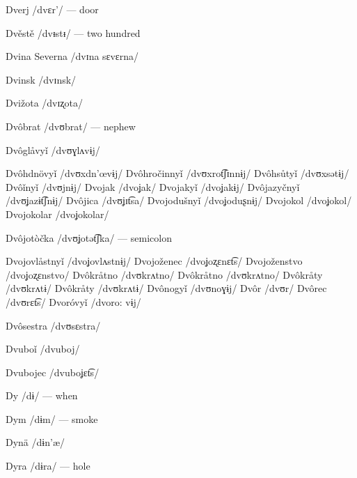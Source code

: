 Dverj /dvɛr’/ — door

Dvěstě /dvᵻstᵻ/ — two hundred

Dvina Severna /dvɪna sɛvɛrna/

Dvinsk /dvɪnsk/

Dvižota /dvɪʐota/

Dvôbrat /dvʊbrat/ — nephew

Dvôglåvyǐ /dvʊɣlʌvɨj/

Dvôhdnövyǐ /dvʊxdn’œvɨj/
Dvôhročinnyǐ /dvʊxrot͡ʃɪnnɨj/
Dvôhsůtyǐ /dvʊxsətɨj/
Dvôǐnyǐ /dvʊjnɨj/
Dvojak /dvoʝak/
Dvojakyǐ /dvoʝakɨj/
Dvôjazyčnyǐ /dvʊʝazɨt͡ʃnɨj/
Dvôjica /dvʊʝɪt͡sa/
Dvojodušnyǐ /dvoʝoduʂnɨj/
Dvojokol /dvoʝokol/
Dvojokolar /dvoʝokolar/

Dvôjotòčka /dvʊʝotət͡ʃka/ — semicolon

Dvojovlåstnyǐ /dvoʝovlʌstnɨj/
Dvojoženec /dvoʝoʐɛnɛt͡s/
Dvojoženstvo /dvoʝoʐɛnstvo/
Dvôkråtno /dvʊkrʌtno/
Dvôkråtno /dvʊkrʌtno/
Dvôkråty /dvʊkrʌtɨ/
Dvôkråty /dvʊkrʌtɨ/
Dvônogyǐ /dvʊnoɣɨj/
Dvôr /dvʊr/
Dvôrec /dvʊrɛt͡s/
Dvoróvyǐ /dvoro: vɨj/

Dvôsestra /dvʊsɛstra/

Dvuboǐ /dvuboj/

Dvubojec /dvuboʝɛt͡s/

Dy /dɨ/ — when

Dym /dɨm/ — smoke

Dynä /dɨn’æ/

Dyra /dɨra/ — hole

